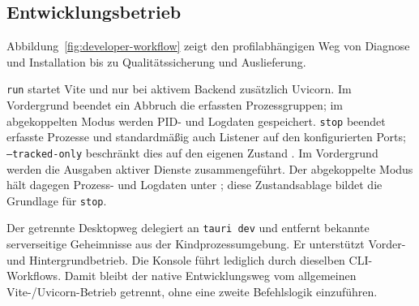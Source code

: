 \subsection{Entwicklungsbetrieb}
\label{subsec:entwicklungsbetrieb}

Abbildung~\ref{fig:developer-workflow} zeigt den profilabhängigen Weg von
Diagnose und Installation bis zu Qualitätssicherung und Auslieferung.



\texttt{run} startet Vite und nur bei aktivem Backend zusätzlich Uvicorn. Im
Vordergrund beendet ein Abbruch die erfassten Prozessgruppen; im abgekoppelten
Modus werden PID- und Logdaten gespeichert. \texttt{stop} beendet erfasste
Prozesse und standardmäßig auch Listener auf den konfigurierten Ports;
\texttt{--tracked-only} beschränkt dies auf den eigenen Zustand
\parencite{kleiveist2026control,kleiveist2026tooling}.
Im Vordergrund werden die Ausgaben aktiver Dienste zusammengeführt. Der
abgekoppelte Modus hält dagegen Prozess- und Logdaten unter
; diese Zustandsablage bildet die Grundlage für
\texttt{stop}.

Der getrennte Desktopweg delegiert an \texttt{tauri dev} und entfernt bekannte
serverseitige Geheimnisse aus der Kindprozessumgebung. Er unterstützt Vorder-
und Hintergrundbetrieb. Die Konsole führt lediglich durch dieselben
CLI-Workflows.
Damit bleibt der native Entwicklungsweg vom allgemeinen Vite-/Uvicorn-Betrieb
getrennt, ohne eine zweite Befehlslogik einzuführen.

